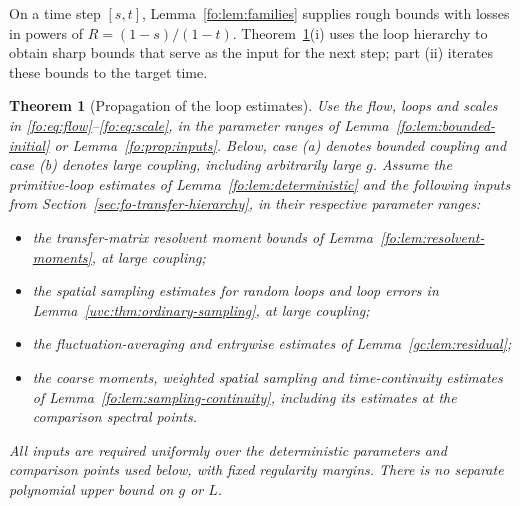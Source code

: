 \documentclass[11pt]{article}
\numberwithin{equation}{section}
\newtheorem{theorem}{Theorem}[section]
\theoremstyle{remark}
\begin{document}
On a time step $[s,t]$, Lemma~\ref{fo:lem:families} supplies rough
bounds with losses in powers of $R=(1-s)/(1-t)$.
Theorem~\ref{gc:thm:common}(i) uses the loop hierarchy to obtain sharp
bounds that serve as the input for the next step; part (ii) iterates
these bounds to the target time.

\begin{theorem}[Propagation of the loop estimates]\label{gc:thm:common}
Use the flow, loops and scales in
\eqref{fo:eq:flow}--\eqref{fo:eq:scale}, in the parameter ranges of
Lemma~\ref{fo:lem:bounded-initial} or Lemma~\ref{fo:prop:inputs}.
Below, case \textup{(a)} denotes
bounded coupling and case \textup{(b)} denotes large coupling, including
arbitrarily large $g$.
Assume the primitive-loop estimates of Lemma~\ref{fo:lem:deterministic}
and the following inputs from Section~\ref{sec:fo-transfer-hierarchy},
in their respective parameter ranges:
\begin{itemize}
\item the transfer-matrix resolvent moment bounds of
Lemma~\ref{fo:lem:resolvent-moments}, at large coupling;
\item the spatial sampling estimates for random loops and loop errors in
Lemma~\ref{uvc:thm:ordinary-sampling}, at large coupling;
\item the fluctuation-averaging and entrywise estimates of
Lemma~\ref{gc:lem:residual};
\item the coarse moments, weighted spatial sampling and time-continuity
estimates of Lemma~\ref{fo:lem:sampling-continuity}, including its
estimates at the comparison spectral points.
\end{itemize}
All inputs are required uniformly over the deterministic parameters and
comparison points used below, with fixed regularity margins.
There is no separate polynomial upper bound on $g$ or $L$.


\end{theorem}
\end{document}
